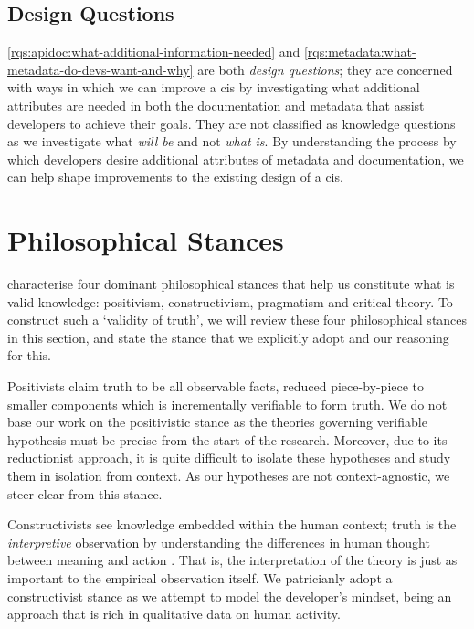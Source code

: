 \subsection{Design Questions}

\ref{rqs:apidoc:what-additional-information-needed} and \ref{rqs:metadata:what-metadata-do-devs-want-and-why} are both \textit{design questions}; they are concerned with ways in which we can improve a \gls{cis} by investigating what additional attributes are needed in both the documentation and metadata that assist developers to achieve their goals.  They are not classified as knowledge questions as we investigate what \textit{will be} and not \textit{what is}. By understanding the process by which developers desire additional attributes of metadata and documentation, we can help shape improvements to the existing design of a \gls{cis}. 


\section{Philosophical Stances}

\citet{Creswell:2017vn} characterise four dominant philosophical stances that help us constitute what is valid knowledge: positivism, constructivism, pragmatism and critical theory. To construct such a `validity of truth', we will review these four philosophical stances in this section, and state the stance that we explicitly adopt and our reasoning for this.

Positivists claim truth to be all observable facts, reduced piece-by-piece to smaller components which is incrementally verifiable to form truth. We do not base our work on the positivistic stance as the theories governing verifiable hypothesis must be precise from the start of the research. Moreover, due to its reductionist approach, it is quite difficult to isolate these hypotheses and study them in isolation from context. As our hypotheses are not context-agnostic, we steer clear from this stance.

Constructivists see knowledge embedded within the human context; truth is the \textit{interpretive} observation by understanding the differences in human thought between meaning and action . That is, the interpretation of the theory is just as important to the empirical observation itself. We patricianly adopt a constructivist stance as we attempt to model the developer's mindset, being an approach that is rich in qualitative data on human activity.

